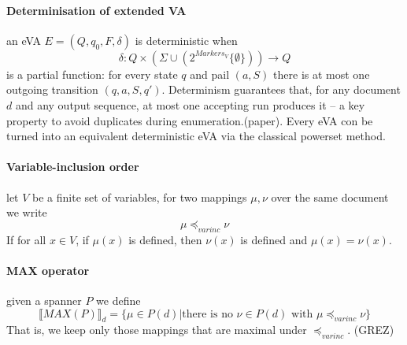 \paragraph{Determinisation of extended VA} an eVA $E = (Q, q_0, F, \delta)$ is deterministic when
$$
\delta : Q \times (\Sigma \cup (2^{Markers_V}\{\emptyset\}))\rightarrow Q
$$
is a partial function: for every state $q$ and pail $(a,S)$ there is at most one outgoing transition $(q,a,S,q')$. Determinism guarantees that, for any document $d$ and any output sequence, at most one accepting run produces it – a key property to avoid duplicates during enumeration.(paper).
Every eVA con be turned into an equivalent deterministic eVA via the classical powerset method.

\paragraph{Variable-inclusion order} let  $V$ be a finite set of variables, for two mappings $\mu, \nu$ over the same document we write
$$
\mu \preccurlyeq_{var inc } \nu
$$
If for all $x \in V$, if $\mu(x)$ is defined, then $\nu(x)$ is defined and  $\mu(x) = \nu(x)$.

\paragraph{MAX operator} given a spanner $P$ we define
$$
\llbracket MAX(P)\rrbracket_d = \{ \mu \in P(d) | \text{there is no } \nu \in P(d) \text{ with } \mu \preccurlyeq_{var inc } \nu \}
$$
That is, we keep only those mappings that are maximal under $\preccurlyeq_{var inc }$. (GREZ) 
  